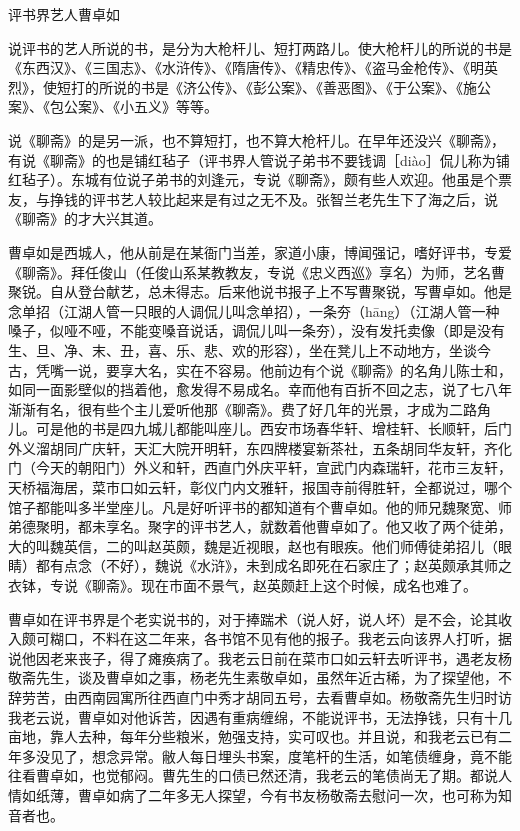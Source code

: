 \documentclass[12pt,UTF8]{ctexbook}
\begin{document}
评书界艺人曹卓如


说评书的艺人所说的书，是分为大枪杆儿、短打两路儿。使大枪杆儿的所说的书是《东西汉》、《三国志》、《水浒传》、《隋唐传》、《精忠传》、《盗马金枪传》、《明英烈》，使短打的所说的书是《济公传》、《彭公案》、《善恶图》、《于公案》、《施公案》、《包公案》、《小五义》等等。

说《聊斋》的是另一派，也不算短打，也不算大枪杆儿。在早年还没兴《聊斋》，有说《聊斋》的也是铺红毡子（评书界人管说子弟书不要钱调［diào］侃儿称为铺红毡子）。东城有位说子弟书的刘逢元，专说《聊斋》，颇有些人欢迎。他虽是个票友，与挣钱的评书艺人较比起来是有过之无不及。张智兰老先生下了海之后，说《聊斋》的才大兴其道。

曹卓如是西城人，他从前是在某衙门当差，家道小康，博闻强记，嗜好评书，专爱《聊斋》。拜任俊山（任俊山系某教教友，专说《忠义西巡》享名）为师，艺名曹聚锐。自从登台献艺，总未得志。后来他说书报子上不写曹聚锐，写曹卓如。他是念单招（江湖人管一只眼的人调侃儿叫念单招），一条夯（hāng）（江湖人管一种嗓子，似哑不哑，不能变嗓音说话，调侃儿叫一条夯），没有发托卖像（即是没有生、旦、净、末、丑，喜、乐、悲、欢的形容），坐在凳儿上不动地方，坐谈今古，凭嘴一说，要享大名，实在不容易。他前边有个说《聊斋》的名角儿陈士和，如同一面影壁似的挡着他，愈发得不易成名。幸而他有百折不回之志，说了七八年渐渐有名，很有些个主儿爱听他那《聊斋》。费了好几年的光景，才成为二路角儿。可是他的书是四九城儿都能叫座儿。西安市场春华轩、增桂轩、长顺轩，后门外义溜胡同广庆轩，天汇大院开明轩，东四牌楼宴新茶社，五条胡同华友轩，齐化门（今天的朝阳门）外义和轩，西直门外庆平轩，宣武门内森瑞轩，花市三友轩，天桥福海居，菜市口如云轩，彰仪门内文雅轩，报国寺前得胜轩，全都说过，哪个馆子都能叫多半堂座儿。凡是好听评书的都知道有个曹卓如。他的师兄魏聚宽、师弟德聚明，都未享名。聚字的评书艺人，就数着他曹卓如了。他又收了两个徒弟，大的叫魏英信，二的叫赵英颇，魏是近视眼，赵也有眼疾。他们师傅徒弟招儿（眼睛）都有点念（不好），魏说《水浒》，未到成名即死在石家庄了；赵英颇承其师之衣钵，专说《聊斋》。现在市面不景气，赵英颇赶上这个时候，成名也难了。

曹卓如在评书界是个老实说书的，对于捧踹术（说人好，说人坏）是不会，论其收入颇可糊口，不料在这二年来，各书馆不见有他的报子。我老云向该界人打听，据说他因老来丧子，得了瘫痪病了。我老云日前在菜市口如云轩去听评书，遇老友杨敬斋先生，谈及曹卓如之事，杨老先生素敬卓如，虽然年近古稀，为了探望他，不辞劳苦，由西南园寓所往西直门中秀才胡同五号，去看曹卓如。杨敬斋先生归时访我老云说，曹卓如对他诉苦，因遇有重病缠绵，不能说评书，无法挣钱，只有十几亩地，靠人去种，每年分些粮米，勉强支持，实可叹也。并且说，和我老云已有二年多没见了，想念异常。敝人每日埋头书案，度笔杆的生活，如笔债缠身，竟不能往看曹卓如，也觉郁闷。曹先生的口债已然还清，我老云的笔债尚无了期。都说人情如纸薄，曹卓如病了二年多无人探望，今有书友杨敬斋去慰问一次，也可称为知音者也。
\end{document}
